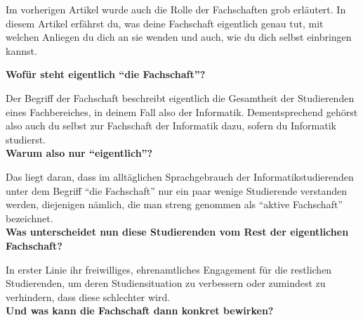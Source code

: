 {Im vorherigen Artikel wurde auch die Rolle der Fachschaften grob erläutert. In diesem Artikel erfährst du, was deine Fachschaft eigentlich genau tut, mit welchen Anliegen du dich an sie wenden und auch, wie du dich selbst einbringen kannst.
}{
    \textbf{Wofür steht eigentlich "`die Fachschaft"'?}

    Der Begriff der Fachschaft beschreibt eigentlich die Gesamtheit der Studierenden eines Fachbereiches, in deinem Fall also der Informatik. Dementsprechend gehörst also auch du selbst zur Fachschaft der Informatik dazu, sofern du Informatik studierst.\\

    \textbf{Warum also nur "`eigentlich"'?}

    Das liegt daran, dass im alltäglichen Sprachgebrauch der Informatikstudierenden  unter dem Begriff "`die Fachschaft"' nur ein paar wenige Studierende verstanden werden, diejenigen nämlich, die man streng genommen als "`aktive Fachschaft"' bezeichnet.\\

    \textbf{Was unterscheidet nun diese Studierenden vom Rest der eigentlichen Fachschaft?}

    In erster Linie ihr freiwilliges, ehrenamtliches Engagement für die restlichen Studierenden, um deren Studiensituation zu verbessern oder zumindest zu verhindern, dass diese schlechter wird.\\

    \textbf{Und was kann die Fachschaft dann konkret bewirken?}

}
